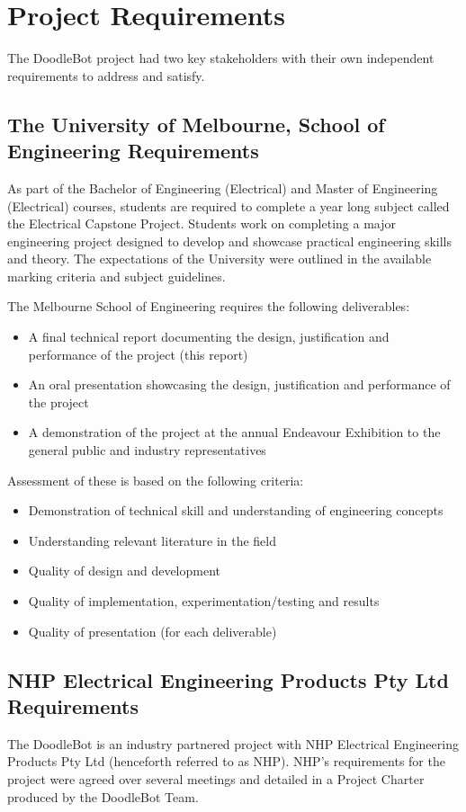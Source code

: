 \section{Project Requirements}

The DoodleBot project had two key stakeholders with their own independent requirements to address and satisfy.

\subsection{The University of Melbourne, School of Engineering Requirements}
As part of the Bachelor of Engineering (Electrical) and Master of Engineering (Electrical) courses, students are required to complete a year long subject called the Electrical Capstone Project. Students work on completing a major engineering project designed to develop and showcase practical engineering skills and theory. The expectations of the University were outlined in the available marking criteria and subject guidelines. 

The Melbourne School of Engineering requires the following deliverables:
	\begin{itemize}
		\item A final technical report documenting the design, justification and performance of the project (this report)
		\item An oral presentation showcasing the design, justification and performance of the project
		\item A demonstration of the project at the annual Endeavour Exhibition to the general public and industry representatives
	\end{itemize}

Assessment of these is based on the following criteria:
	\begin{itemize}
		\item Demonstration of technical skill and understanding of engineering concepts
		\item Understanding relevant literature in the field
		\item Quality of design and development
		\item Quality of implementation, experimentation/testing and results
		\item Quality of presentation (for each deliverable)
	\end{itemize}
	
\subsection{NHP Electrical Engineering Products Pty Ltd Requirements}
The DoodleBot is an industry partnered project with NHP Electrical Engineering Products Pty Ltd (henceforth referred to as NHP). NHP's requirements for the project were agreed over several meetings and detailed in a Project Charter produced by the DoodleBot Team.

